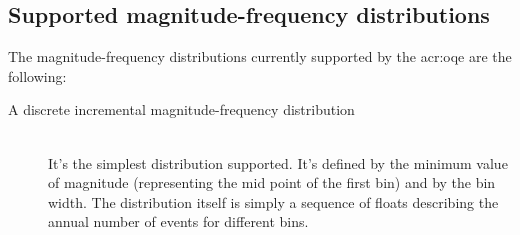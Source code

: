 \subsection{Supported magnitude-frequency distributions}
The magnitude-frequency distributions currently supported by the 
\gls{acr:oqe} are the following: 
\begin{description}
    \item[A discrete incremental magnitude-frequency distribution] \hfill \\
    It's the simplest distribution supported. It's defined by the 
    minimum value of magnitude (representing the mid point of the first
    bin) and by the bin width. The distribution itself is simply a 
    sequence of floats describing the annual number of events for 
    different bins. 


\end{description}
